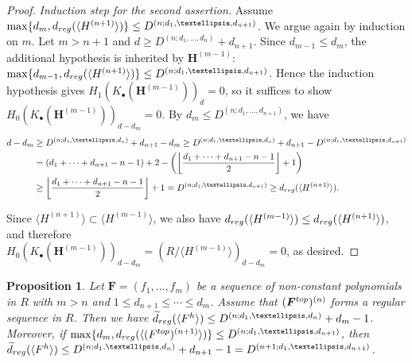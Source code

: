 \documentclass{article}
\newtheorem{proposition}[theorem]{Proposition}
\theoremstyle{definition}
\theoremstyle{plain}
\theoremstyle{plain}
\theoremstyle{plain}
\theoremstyle{plain}
\numberwithin{equation}{subsection}
\begin{document}
\begin{proof}
\medskip\noindent
\emph{Induction step for the second assertion.}
Assume $\max\{d_m, d_{\rm reg}(\langle {H}^{(n+1)}\rangle)\}\le D^{(n;d_1,\ldots,d_{n+1})}$.
We argue again by induction on $m$.
Let $m>n+1$ and $d\ge D^{(n;d_1,\ldots,d_n)}+d_{n+1}$.
Since $d_{m-1}\leq d_m$, the additional hypothesis is inherited by $\bm H^{(m-1)}$:
$\max\{d_{m-1}, d_{\rm reg}(\langle H^{(n+1)}\rangle)\} \leq D^{(n;d_1,\ldots,d_{n+1})}$.
Hence the induction hypothesis gives $H_1(K_\bullet(\bm H^{(m-1)}))_d=0$, so it suffices to show $H_0(K_\bullet(\bm{H}^{(m-1)}))_{d-d_m}=0$.
By $d_m\le D^{(n;d_1,\ldots,d_{n+1})}$, we have
{\small 
\vskip -5mm
\begin{align*}
d-d_{m}& \geq  D^{(n;d_1,\ldots,d_n)}+d_{n+1}-d_{m} \geq D^{(n;d_1,\ldots,d_n)}+d_{n+1}-D^{(n;d_1,\ldots,d_{n+1})} \\
& =  (d_1+\cdots +d_{n+1}-n-1)+2-\left(\left\lfloor \frac{d_1+\cdots +d_{n+1}-n-1}{2}\right\rfloor+1\right)\\
& \geq  \left\lfloor \frac{d_1+\cdots +d_{n+1}-n-1}{2}\right\rfloor+1=D^{(n;d_1,\ldots,d_{n+1})} \geq d_{\rm reg}(\langle H^{(n+1)} \rangle).
\end{align*}}

\vskip -1mm
\noindent
Since $\langle {H}^{(n+1)}\rangle\subset \langle {H}^{(m-1)}\rangle$, we also have $d_{\rm reg}(\langle{H}^{(m-1)}\rangle)\le d_{\rm reg}(\langle {H}^{(n+1)}\rangle)$, and therefore\\
$H_0(K_{\bullet}(\bm{H}^{(m-1)}))_{d-d_m}=(R/\langle {H}^{(m-1)}\rangle)_{d-d_m}=0$, as desired.
\end{proof}

\begin{proposition}\label{prop:sdb}
Let $\bm{F} = (f_1,\ldots,f_m)$ be a sequence of non-constant polynomials in $R$ with $m >  n$ and $1\leq d_{n+1} \leq \cdots \leq d_m$. 
Assume that $(\bm{F}^{\rm top})^{(n)}$ forms a regular sequence in $R$.
Then we have $\widetilde{d}_{\rm reg}(\langle F^h\rangle)\leq D^{(n;d_1,\ldots,d_n)}+d_m-1$.
Moreover, if $\max\{d_m, d_{\rm reg}(\langle (F^{\rm top})^{(n+1)}\rangle)\}\leq D^{(n;d_1,\ldots,d_{n+1})}$, then $\widetilde{d}_{\rm reg}(\langle F^h\rangle) \leq D^{(n;d_1,\ldots,d_n)}+d_{n+1}-1 = D^{(n+1;d_1,\ldots,d_{n+1})}$.
\end{proposition}
\end{document}
